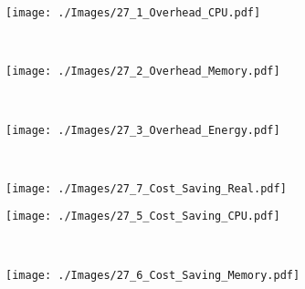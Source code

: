 \documentclass[journal]{IEEEtran}
\begin{document}
\begin{figure*}[t!]
        \centering
        \begin{subfigure}[b]{165pt}
                \centering
                \texttt{[image: ./Images/27\_1\_Overhead\_CPU.pdf]}
\caption{\footnotesize }
                \label{Figure:Overhead_CPU}
        \end{subfigure}~ \begin{subfigure}[b]{165pt}
                \centering
                \texttt{[image: ./Images/27\_2\_Overhead\_Memory.pdf]}
\caption{\footnotesize }
                \label{Figure:Overhead_Memory}
        \end{subfigure}
        ~ \begin{subfigure}[b]{165pt}
                \centering
                \texttt{[image: ./Images/27\_3\_Overhead\_Energy.pdf]}
\caption{\footnotesize }
                \label{Figure:Overhead_Energy}
                
        \end{subfigure}
~ 

         \begin{subfigure}[b]{165pt}
\centering
         \texttt{[image: ./Images/27\_7\_Cost\_Saving\_Real.pdf]}
\caption{\footnotesize }
          \label{Figure:Cost_Saving_Real}
         \end{subfigure}\begin{subfigure}[b]{165pt}
                \centering
                \texttt{[image: ./Images/27\_5\_Cost\_Saving\_CPU.pdf]}
\caption{\footnotesize }
                \label{Figure:Cost_Saving_CPU}
        \end{subfigure}
        ~ \begin{subfigure}[b]{165pt}
                \centering
                \texttt{[image: ./Images/27\_6\_Cost\_Saving\_Memory.pdf]}
\caption{\footnotesize }
                \label{Figure:Cost_Saving_Memory}
        \end{subfigure}
        
    
~ 


\end{figure*}
\end{document}
